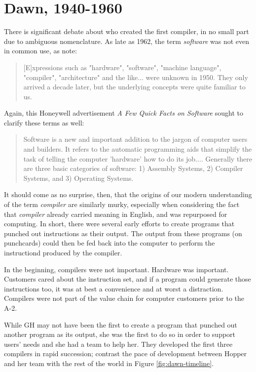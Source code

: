 \chapter{Dawn, 1940-1960}

There is significant debate about who created the first compiler,
in no small part due to ambiguous nomenclature.
As late as 1962, the term \textit{software} was not even in common use, as \citeauthor{the_first_computers_2002} note:

\begin{quotation}
[E]xpressions such as "hardware", "software", "machine language", "compiler",
"architecture" and the like... were unknown in 1950. They only arrived a decade
later, but the underlying concepts were quite familiar to us.
\cite{the_first_computers_2002}
\end{quotation}

Again, this Honeywell advertisement \textit{A Few Quick Facts on Software} sought to clarify these terms as well:

\begin{quotation}
Software is a new and important addition to the jargon of computer users and builders.
It refers to the automatic programming aids that simplify the task of telling the computer 'hardware' how to do its job....
Generally there are three basic categories of software:
1) Assembly Systems, 2) Compiler Systems, and 3) Operating Systems.\cite[ch.5]{new_history_of_modern_computing}
\end{quotation}

It should come as no surprise, then, that the origins of our modern understanding of the
term \textit{compiler} are similarly murky, especially when considering the fact that
\textit{compiler} already carried meaning in English, and was repurposed for computing.
In short, there were several early efforts to create programs that punched out instructions
as their output.
The output from these programs (on punchcards) could then be fed back into the computer
to perform the instructiond produced by the compiler.

In the beginning, compilers were not important.
Hardware was important.
Customers cared about the instruction set,
and if a program could generate those instructions too,
it was at best a convenience and at worst a distraction.
Compilers were not part of the value chain for computer customers prior to the A-2.


While GH may not have been the first to create a program that
punched out another program as its output, she was the first to
do so in order to support users' needs and she had a team to help her.
They developed the first three compilers in rapid succession;
contrast the pace of development between Hopper and her team with the rest of the world
in Figure \ref{fig:dawn-timeline}.


